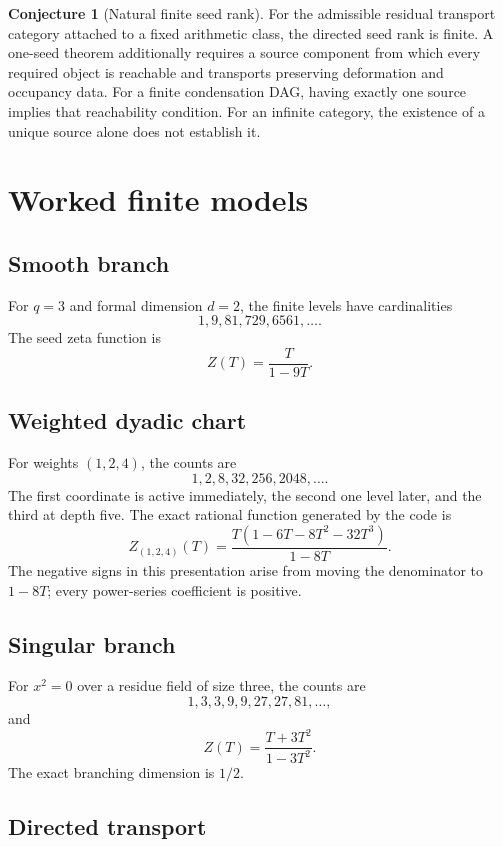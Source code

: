 \documentclass[11pt]{article}
\theoremstyle{definition}
\newtheorem{conjecture}[theorem]{Conjecture}
\theoremstyle{remark}
\begin{document}
\begin{conjecture}[Natural finite seed rank]\label{px:11.3}
For the admissible residual transport category attached to a fixed arithmetic class, the directed seed rank is finite.  A one-seed theorem additionally requires a source component from which every required object is reachable and transports preserving deformation and occupancy data.  For a finite condensation DAG, having exactly one source implies that reachability condition.  For an infinite category, the existence of a unique source alone does not establish it.
\end{conjecture}

\section{Worked finite models}

\subsection{Smooth branch}

For \(q=3\) and formal dimension \(d=2\), the finite levels have cardinalities
\[
1,9,81,729,6561,\ldots.
\]
The seed zeta function is
\[
Z(T)=\frac{T}{1-9T}.
\]

\subsection{Weighted dyadic chart}

For weights \((1,2,4)\), the counts are
\[
1,2,8,32,256,2048,\ldots.
\]
The first coordinate is active immediately, the second one level later, and the third at depth five.  The exact rational function generated by the code is
\[
Z_{(1,2,4)}(T)
=
\frac{T(1-6T-8T^2-32T^3)}{1-8T}.
\]
The negative signs in this presentation arise from moving the denominator to \(1-8T\); every power-series coefficient is positive.

\subsection{Singular branch}

For \(x^2=0\) over a residue field of size three, the counts are
\[
1,3,3,9,9,27,27,81,\ldots,
\]
and
\[
Z(T)=\frac{T+3T^2}{1-3T^2}.
\]
The exact branching dimension is \(1/2\).

\subsection{Directed transport}
\end{document}
